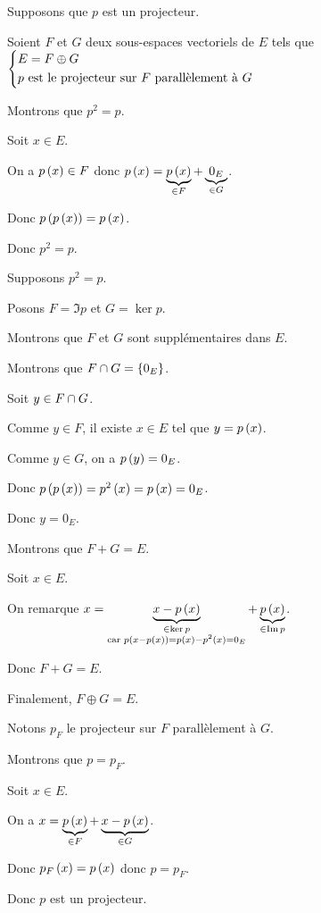 \begin{dem}
\impdir

Supposons que \(p\) est un projecteur.

Soient \(F\) et \(G\) deux sous-espaces vectoriels de \(E\) tels que \(\begin{dcases}E=F\oplus G \\ p\text{ est le projecteur sur }F\text{ parallèlement à }G\end{dcases}\)

Montrons que \(p^2=p\).

Soit \(x\in E\).

On a \(p\left(x\right)\in F\) donc \(p\left(x\right)=\underbrace{p\left(x\right)}_{\in F}+\underbrace{0_E}_{\in G}\).

Donc \(p\left(p\left(x\right)\right)=p\left(x\right)\).

Donc \(p^2=p\).

\imprec

Supposons \(p^2=p\).

Posons \(F=\Im p\) et \(G=\ker p\).

Montrons que \(F\) et \(G\) sont supplémentaires dans \(E\).

Montrons que \(F\cap G=\left\lbrace0_E\right\rbrace\).

Soit \(y\in F\cap G\).

Comme \(y\in F\), il existe \(x\in E\) tel que \(y=p\left(x\right)\).

Comme \(y\in G\), on a \(p\left(y\right)=0_E\).

Donc \(p\left(p\left(x\right)\right)=p^2\left(x\right)=p\left(x\right)=0_E\).

Donc \(y=0_E\).

Montrons que \(F+G=E\).

Soit \(x\in E\).

On remarque \(x=\underbrace{x-p\left(x\right)}_{\substack{\in\ker p \\ \text{car }p\left(x-p\left(x\right)\right)=p\left(x\right)-p^2\left(x\right)=0_E}}+\underbrace{p\left(x\right)}_{\in\operatorname{Im} p}\).

Donc \(F+G=E\).

Finalement, \(F\oplus G=E\).

Notons \(p_F\) le projecteur sur \(F\) parallèlement à \(G\).

Montrons que \(p=p_F\).

Soit \(x\in E\).

On a \(x=\underbrace{p\left(x\right)}_{\in F}+\underbrace{x-p\left(x\right)}_{\in G}\).

Donc \(p_F\left(x\right)=p\left(x\right)\) donc \(p=p_F\).

Donc \(p\) est un projecteur.
\end{dem}

